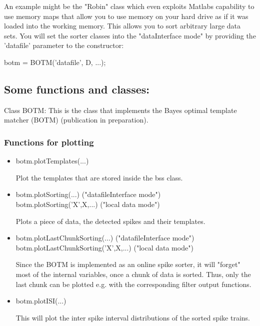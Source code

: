 \documentclass[11pt]{article} %
\begin{document}
An example might be the "Robin" class which even exploits Matlabs capability to use memory maps that allow you to use memory on your hard drive as if it was loaded into the working memory. This allows you to sort arbitrary large data sets. You will set the sorter classes into the "dataInterface mode" by providing the 'datafile' parameter to the constructor:

botm = BOTM('datafile', D, ...);

\subsection{Some functions and classes:}

Class BOTM: This is the class that implements the Bayes optimal template matcher (BOTM) (publication in preparation).

\subsubsection{Functions for plotting}
\begin{itemize}

\item botm.plotTemplates(...)

Plot the templates that are stored inside the bss class.

\item botm.plotSorting(...) ("datafileInterface mode")\\
botm.plotSorting('X',X,...) ("local data mode")

Plots a piece of data, the detected spikes and their templates.

\item botm.plotLastChunkSorting(...) ("datafileInterface mode")\\
botm.plotLastChunkSorting('X',X,...) ("local data mode")

Since the BOTM is implemented as an online spike sorter, it will "forget" most of the internal variables, once a chunk of data is sorted. Thus, only the last chunk can be plotted e.g. with the corresponding filter output functions.

\item botm.plotISI(...)

This will plot the inter spike interval distributions of the sorted spike trains.

\end{itemize}
\end{document}
